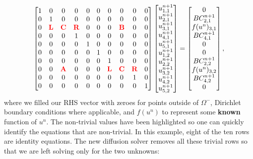 \documentclass[oneside,12pt,final]{/Applications/TeX/packages/ucthesis-CA2012}
\begin{document}
\begin{mainmatter}
\dhalfsp
\begin{equation}
\begin{bmatrix}
1 & 0 & 0 & 0 & 0 & 0 & 0 & 0 & 0 & 0\\
0 & 1 & 0 & 0 & 0 & 0 & 0 & 0 & 0 & 0\\
0 & \color{red} \textbf{L} & \color{red} \textbf{C} & \color{red} \textbf{R} & 0 & 0 & 0 & \color{red} \textbf{B}  & 0 & 0\\
0 & 0 & 0 & 1 & 0 & 0 & 0 & 0 & 0 & 0\\
0 & 0 & 0 & 0 & 1 & 0 & 0 & 0 & 0 & 0\\
0 & 0 & 0 & 0 & 0 & 1 & 0 & 0 & 0 & 0\\
0 & 0 & 0 & 0 & 0 & 0 & 1 & 0 & 0 & 0\\
0 & 0 & \color{red} \textbf{A} & 0 & 0 & 0 & \color{red} \textbf{L} & \color{red} \textbf{C} & \color{red} \textbf{R} & 0\\
0 & 0 & 0 & 0 & 0 & 0 & 0 & 0 & 1 & 0\\
0 & 0 & 0 & 0 & 0 & 0 & 0 & 0 & 0 & 1\\
\end{bmatrix}
\begin{bmatrix}
u^{n+1}_{1,1}\\
u^{n+1}_{2,1}\\
u^{n+1}_{3,1}\\
u^{n+1}_{4,1}\\
u^{n+1}_{5,1}\\
u^{n+1}_{1,2}\\
u^{n+1}_{2,2}\\
u^{n+1}_{3,2}\\
u^{n+1}_{4,2}\\
u^{n+1}_{5,2}\\
\end{bmatrix} =
\begin{bmatrix}
0\\
BC^{n+1}_{2,1}\\
f(u^n)_{3,1}\\
BC^{n+1}_{4,1}\\
0\\
0\\
BC^{n+1}_{2,2}\\
f(u^n)_{3,2}\\
BC^{n+1}_{4,2}\\
0\\
\end{bmatrix},
\end{equation}
\dsp
where we filled our RHS vector with zeroes for points outside of $\Omega^-$, Dirichlet boundary conditions where applicable, and $f(u^n)$ to represent some \textbf{known} function of $u^n$. The non-trivial values have been highlighted so one can quickly identify the equations that are non-trivial. In this example, eight of the ten rows are identity equations. The new diffusion solver removes all these trivial rows so that we are left solving only for the two unknowns:

\end{mainmatter}
\end{document}
